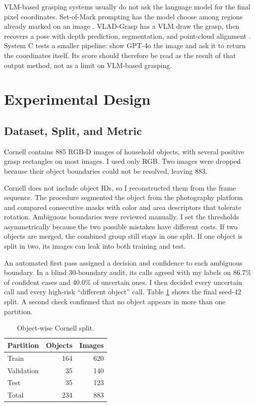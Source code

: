 \documentclass[10pt,conference,compsoc]{IEEEtran}
\begin{document}
VLM-based grasping systems usually do not ask the language model for the final
pixel coordinates. Set-of-Mark prompting has the model choose among regions
already marked on an image \cite{yang2024}. VLAD-Grasp has a VLM draw the
grasp, then recovers a pose with depth prediction, segmentation, and
point-cloud alignment \cite{kulshrestha2025}. System C tests a smaller
pipeline: show GPT-4o the image and ask it to return the coordinates itself.
Its score should therefore be read as the result of that output method, not
as a limit on VLM-based grasping.

\section{Experimental Design}

\subsection{Dataset, Split, and Metric}

Cornell contains 885 RGB-D images of household objects, with several positive
grasp rectangles on most images. I used only RGB. Two images were dropped
because their object boundaries could not be resolved, leaving 883.

Cornell does not include object IDs, so I reconstructed them from the frame
sequence. The procedure segmented the object from the photography platform
and compared consecutive masks with color and area descriptors that tolerate
rotation. Ambiguous boundaries were reviewed manually. I set the thresholds
asymmetrically because the two possible mistakes have different costs. If two
objects are merged, the combined group still stays in one split. If one
object is split in two, its images can leak into both training and test.

An automated first pass assigned a decision and confidence to each ambiguous
boundary. In a blind 30-boundary audit, its calls agreed with my labels on
86.7\% of confident cases and 40.0\% of uncertain ones. I then decided every
uncertain call and every high-risk ``different object'' call. Table
\ref{tab:split} shows the final seed-42 split. A second check confirmed that
no object appears in more than one partition.

\begin{table}[t]
\caption{Object-wise Cornell split.}
\label{tab:split}
\centering
\begin{tabular}{lrr}
\toprule
Partition & Objects & Images \\
\midrule
Train & 164 & 620 \\
Validation & 35 & 140 \\
Test & 35 & 123 \\
\midrule
Total & 234 & 883 \\
\bottomrule
\end{tabular}
\end{table}
\end{document}
